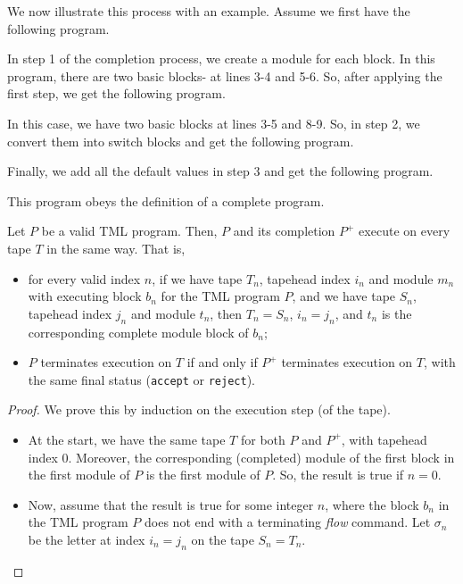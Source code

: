 \begin{appendices}
We now illustrate this process with an example. Assume we first have the following program.

In step 1 of the completion process, we create a module for each block. In this program, there are two basic blocks- at lines 3-4 and 5-6. So, after applying the first step, we get the following program.

In this case, we have two basic blocks at lines 3-5 and 8-9. So, in step 2, we convert them into switch blocks and get the following program.

Finally, we add all the default values in step 3 and get the following program.

This program obeys the definition of a complete program.

\begin{theorem} \label{thm:complete_TM}
    Let $P$ be a valid TML program. Then, $P$ and its completion $P^+$ execute on every tape $T$ in the same way. That is,
    \begin{itemize}
        \item for every valid index $n$, if we have tape $T_n$, tapehead index $i_n$ and module $m_n$ with executing block $b_n$ for the TML program $P$, and we have tape $S_n$, tapehead index $j_n$ and module $t_n$, then $T_n = S_n$, $i_n = j_n$, and $t_n$ is the corresponding complete module block of $b_n$;
        \item $P$ terminates execution on $T$ if and only if $P^+$ terminates execution on $T$, with the same final status (\texttt{accept} or \texttt{reject}).
    \end{itemize}
\end{theorem}
\begin{proof}
    We prove this by induction on the execution step (of the tape). 
    \begin{itemize}
        \item At the start, we have the same tape $T$ for both $P$ and $P^+$, with tapehead index 0. Moreover, the corresponding (completed) module of the first block in the first module of $P$ is the first module of $P$. So, the result is true if $n = 0$. 
        \item Now, assume that the result is true for some integer $n$, where the block $b_n$ in the TML program $P$ does not end with a terminating \textit{flow} command. Let $\sigma_n$ be the letter at index $i_n = j_n$ on the tape $S_n = T_n$.
        \begin{itemize}

\end{itemize}
\end{itemize}
\end{proof}
\end{appendices}

